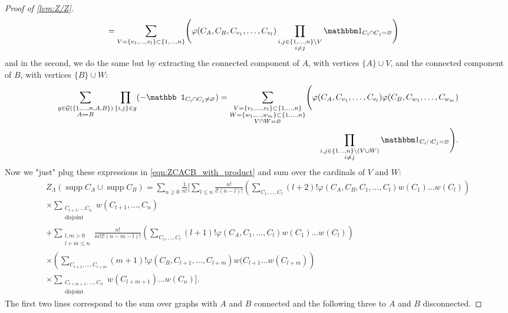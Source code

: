 \documentclass{article}
\DeclareMathOperator{\disj}{disjoint}
\DeclareMathOperator{\supp}{supp}
\begin{document}
\begin{proof}[Proof of \cref{lem:Z/Z}]
\begin{align*}
         =\sum_{V=\{v_1,\ldots,v_l\}\subset\{1,\ldots,n\}}\Biggl(\varphi(C_A,C_B,C_{v_1},\ldots,C_{v_l})
         \prod_{\substack{i,j\in \{1,\ldots,n\}\setminus V\\i\neq j}}\mathbbm 1_{C_i\cap C_j=\varnothing}\Biggr)&
     \end{align*}
     and in the second, we do the same but by extracting the connected component of $A$, with vertices $\{A\}\cup V$, and the connected component of $B$, with vertices $\{B\}\cup W$:   
     \begin{align*}
         \sum_{\substack{g \in\mathcal G (\{1,\ldots,n,A,B\})\\A\nleftrightarrow B}}\prod_{\{i,j\}\in g}(-\mathbb 1_{C_i\cap C_j\neq\varnothing})=\sum_{\substack{V=\{v_1,\ldots,v_l\}\subset \{1,\ldots,n\}\\
                 W=\{w_1,\ldots,w_m\}\subset\{1,\ldots,n\}\\
                 V\cap W=\varnothing}}\Biggl(\varphi(C_A,C_{v_1},\ldots,C_{v_l})\varphi(C_B,C_{w_1},\ldots,C_{w_m})\\
         \prod_{\substack{i,j\in \{1\ldots,n\}\setminus (V \cup W)\\i\neq j}}\mathbbm 1_{C_i\cap C_j=\varnothing}\Biggr).
     \end{align*}
     Now we "just" plug these expressions in \cref{eqn:ZCACB_with_product} and sum over the cardinals of $V$ and $W$:        \begin{align*}
         Z_\Lambda(\supp C_A\cup \supp C_B)=\sum_{n\geq 0}\frac 1{n!}\Biggl[\sum_{l\leq n} \frac{n!}{l!(n-l)!}\left(\sum_{C_1,\ldots,C_l}(l+2)!\varphi(C_A,C_B,C_1,\ldots,C_l)w(C_1)\ldots w(C_l)\right)
         \\
         \times\sum_{\substack{C_{l+1},\ldots C_n\\\disj}}w(C_{l+1},\ldots,C_n)
         \\
         +\sum_{\substack{l,m>0\\l+m\leq n}}\frac{n!}{m!l!(n-m-l)!}\left(\sum_{C_1,\ldots,C_l}(l+1)!\varphi(C_A,C_1,\ldots,C_l)w(C_1)\ldots w(C_l)\right)
         \\
         \times
         \left(\sum_{C_{l+1},\ldots,C_{l+m}}(m+1)!\varphi(C_B,C_{l+1},\ldots,C_{l+m})w(C_{l+1}\ldots w(C_{l+m})\right)
         \\
         \times
         \sum_{\substack{C_{l+m+1},\ldots,C_{n}\\\disj}}w(C_{l+m+1})\ldots w(C_n)\Biggr].
     \end{align*}
     The first two lines correspond to the sum over graphs with $A$ and $B$ connected and the following three to $A$ and $B$ disconnected. 

\end{proof}
\end{document}
